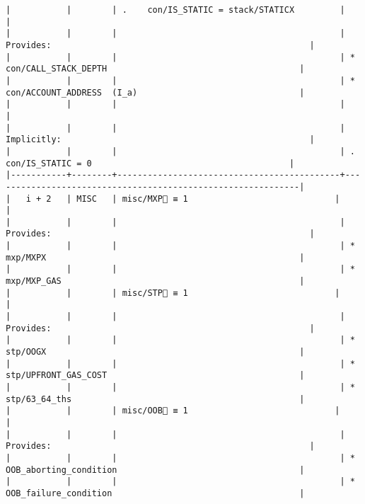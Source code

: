 \documentclass[varwidth=\maxdimen,margin=0.5cm,multi={verbatim}]{standalone}
\begin{document}
\begin{verbatim}
|           |        | .    con/IS_STATIC = stack/STATICX         |                                                             |
|           |        |                                            | Provides:                                                   |
|           |        |                                            | * con/CALL_STACK_DEPTH                                      |
|           |        |                                            | * con/ACCOUNT_ADDRESS  (I_a)                                |
|           |        |                                            |                                                             |
|           |        |                                            | Implicitly:                                                 |
|           |        |                                            | .   con/IS_STATIC = 0                                       |
|-----------+--------+--------------------------------------------+-------------------------------------------------------------|
|   i + 2   | MISC   | misc/MXP🚩 ≡ 1                             |                                                             |
|           |        |                                            | Provides:                                                   |
|           |        |                                            | * mxp/MXPX                                                  |
|           |        |                                            | * mxp/MXP_GAS                                               |
|           |        | misc/STP🚩 ≡ 1                             |                                                             |
|           |        |                                            | Provides:                                                   |
|           |        |                                            | * stp/OOGX                                                  |
|           |        |                                            | * stp/UPFRONT_GAS_COST                                      |
|           |        |                                            | * stp/63_64_ths                                             |
|           |        | misc/OOB🚩 ≡ 1                             |                                                             |
|           |        |                                            | Provides:                                                   |
|           |        |                                            | * OOB_aborting_condition                                    |
|           |        |                                            | * OOB_failure_condition                                     |

\end{verbatim}
\end{document}
